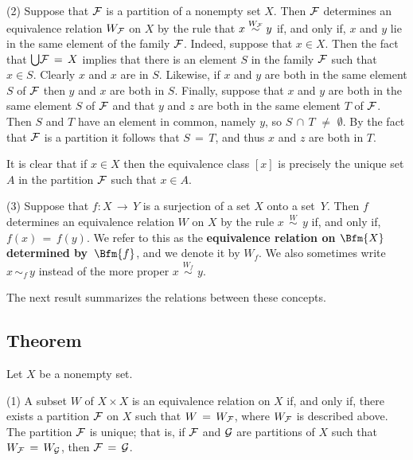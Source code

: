 \V

        (2) Suppose that ${\cal F}$ is a partition of a nonempty set $X$.
    Then ${\cal F}$ determines an equivalence relation $W_{{\cal F}}$ on $X$ by the rule that $x \stackrel{W_{{\cal F}}}{\,{\sim}\,} y$ if, and only if,
    $x$ and $y$ lie in the same element of the family ${\cal F}$. Indeed, suppose that $x{\in}X$.
    Then the fact that ${\bigcup} {\cal F} \,=\, X$ implies that there is an element $S$ in the family ${\cal F}$ such that $x{\in}S$.
    Clearly $x$ and $x$ are in $S$. Likewise, if $x$ and $y$ are both in the same element $S$ of ${\cal F}$ then $y$ and $x$ are both in $S$.
    Finally, suppose that $x$ and $y$ are both in the same element $S$ of ${\cal F}$ and that $y$ and $z$ are both in the same element $T$ of ${\cal F}$.
    Then $S$ and $T$ have an element in common, namely $y$, so $S\,{\cap}\,T \,\,{\neq}\,\, {\emptyset}$.
    By the fact that ${\cal F}$ is a partition it follows that $S \,=\, T$, and thus $x$ and $z$ are both in $T$.

        It is clear that if $x{\in}X$ then the equivalence class $[x]$ is precisely the unique set $A$ in the partition ${\cal F}$ such that $x{\in}A$.

\V

        (3) Suppose that $f:X \,{\rightarrow}\, Y$ is a surjection of a set $X$ onto a set~$Y$.
    Then $f$ determines an equivalence relation $W$ on $X$ by the rule $x \stackrel{W}{\,\sim\,}y$ if, and only if, $f(x) \,=\, f(y)$.
    We refer to this as the {\bf equivalence relation on $\Bfm{X}$ determined by~$\Bfm{f}$}, and we denote it by $W_{f}$.
    We also sometimes write $x\,{\sim}_{f}\,y$ instead of the more proper $x \stackrel{W_{f}}{\,\sim\,}y$.

\VV

        The next result summarizes the relations between these concepts.

        \subsection{\small{{\bf Theorem}}}
        \label{ThmA50.110}

        Let $X$ be a nonempty set.

\V

        (1) A subset $W$ of $X{\times}X$ is an equivalence relation on $X$ if, and only if,
    there exists a partition ${\cal F}$ on $X$ such that $W \,=\, W_{{\cal F}}$, where $W_{{\cal F}}$ is described above.
    The partition ${\cal F}$ is unique; that is, if ${\cal F}$ and ${\cal G}$ are partitions of $X$ such that $W_{{\cal F}} \,=\, W_{{\cal G}}$, then ${\cal F} \,=\, {\cal G}$.

